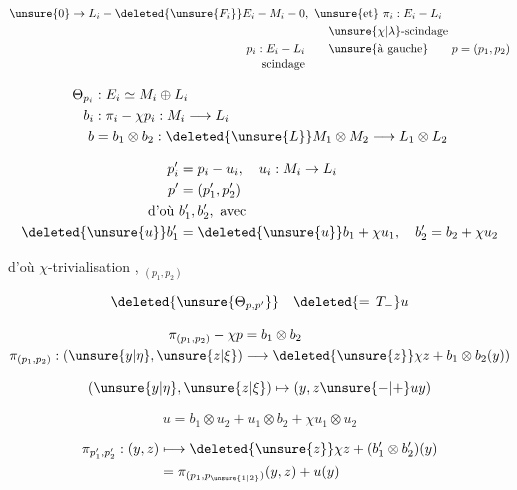 
\[
\begin{aligned}
\unsure{0}\to L_i - \deleted{\unsure{F_i}}E_i - M_i - 0
 &,\ \unsure{\text{et}}\ \pi_i:E_i-L_i\\
 &\qquad\unsure{\chi|\lambda}\text{-scindage}\\
p_i:E_i-L_i &\qquad\unsure{\text{à gauche}}\qquad p=(p_1,p_2)\\[-2pt]
\text{scindage}&
\end{aligned}
\]

\[
\begin{aligned}
\Theta_{p_i}&:E_i\simeq M_i\oplus L_i\\
b_i&:\pi_i-\chi p_i:M_i\longrightarrow L_i\\
b&=b_1\otimes b_2:\deleted{\unsure{L}}M_1\otimes M_2\longrightarrow L_1\otimes L_2
\end{aligned}
\]

\[
\begin{aligned}
p'_i&=p_i-u_i,\quad u_i:M_i\to L_i\\
p'&=(p'_1,p'_2)\\
\text{d'où }&b'_1,b'_2,\ \text{avec}\\
\deleted{\unsure{u}}b'_1&=\deleted{\unsure{u}}b_1+\chi u_1,\quad b'_2=b_2+\chi u_2
\end{aligned}
\]

d'où $\chi$-trivialisation , $_{(p_1,p_2)}$


\[
\deleted{\unsure{\Theta_{p,p'}}}\quad\deleted{={}\,T_{-}}u
\]

\[
\begin{aligned}
\pi_{(p_1,p_2)}-\chi p&=b_1\otimes b_2\\
\pi_{(p_1,p_2)}:(\unsure{y|\eta},\unsure{z|\xi})&\longrightarrow
 \deleted{\unsure{z}}\chi z+b_1\otimes b_2(y))
\end{aligned}
\]

\[
(\unsure{y|\eta},\unsure{z|\xi})\mapsto(y,z\unsure{-|+}uy)
\]

\[
u=b_1\otimes u_2+u_1\otimes b_2+\chi u_1\otimes u_2
\]


\[
\begin{aligned}
\pi_{p'_1,p'_2}:(y,z)&\longmapsto\deleted{\unsure{z}}\chi z+(b'_1\otimes b'_2)(y)\\
 &=\pi_{(p_1,p_{\unsure{1|2}})}(y,z)+u(y)
\end{aligned}
\]

